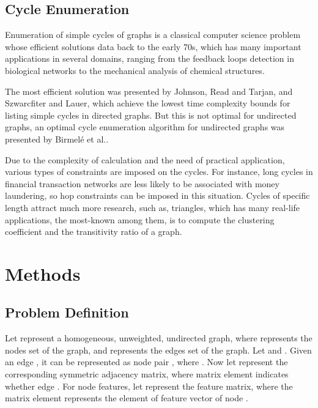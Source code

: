 \documentclass[sigconf]{acmart}
\begin{document}
\subsection{Cycle Enumeration} Enumeration of simple cycles of graphs is a classical computer science problem whose efficient solutions data back to the early 70s, which has many important applications in several domains, ranging from the feedback loops detection in biological networks\cite{klamt2009computing} to the mechanical analysis of chemical structures\cite{sussenguth1965graph}.

The most efficient solution was presented by Johnson\cite{johnson1975finding}, Read and Tarjan\cite{read1975bounds}, and Szwarcfiter and Lauer\cite{szwarcfiter1976search}, which achieve the lowest time complexity bounds for listing simple cycles in directed graphs. But this is not optimal for undirected graphs, an optimal cycle enumeration algorithm for undirected graphs was presented by Birmel\'{e} et al.\cite{birmele2013optimal}. 

Due to the complexity of calculation and the need of practical application, various types of constraints are imposed on the cycles. For instance, long cycles in financial transaction networks are less likely to be associated with money laundering, so hop constraints can be imposed in this situation\cite{qin2019towards}. Cycles of specific length attract much more research, such as, triangles, which has many real-life applications, the most-known among them, is to compute the clustering coefficient\cite{watts1998collective} and the transitivity ratio\cite{luce1949method} of a graph.

\section{Methods}
\label{sec:methods}

\subsection{Problem Definition}
Let  represent a homogeneous, unweighted, undirected graph, where  represents the nodes set of the graph, and  represents the edges set of the graph. Let  and . Given an edge , it can be represented as node pair , where .  Now let  represent the corresponding symmetric adjacency matrix, where matrix element  indicates whether edge . For node features, let  represent the feature matrix, where the matrix element  represents the  element of feature vector of node .
\end{document}
